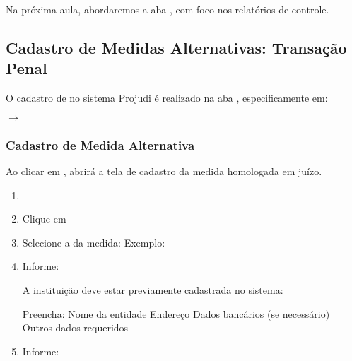 \documentclass[letterpaper,10pt,brazil]{sphinxmanual}
\begin{document}
\sphinxAtStartPar
Na próxima aula, abordaremos a aba , com foco nos relatórios de controle.

\sphinxstepscope


\subsection{Cadastro de Medidas Alternativas: Transação Penal}
\label{\detokenize{projud_54_cadastromedidasalternativas:cadastro-de-medidas-alternativas-transacao-penal}}\label{\detokenize{projud_54_cadastromedidasalternativas::doc}}
\sphinxAtStartPar
O cadastro de  no sistema Projudi é realizado na aba
, especificamente em:

\sphinxAtStartPar
{} \(\rightarrow\) 


\subsubsection{Cadastro de Medida Alternativa}
\label{\detokenize{projud_54_cadastromedidasalternativas:cadastro-de-medida-alternativa}}
\sphinxAtStartPar
Ao clicar em , abrirá a tela de cadastro da medida homologada em juízo.
\begin{enumerate}
%
\item {} 
\sphinxAtStartPar
{}

\item {} 
\sphinxAtStartPar
Clique em 

\item {} 
\sphinxAtStartPar
Selecione a  da medida:
\sphinxhyphen{} Exemplo: 

\item {} 
\sphinxAtStartPar
Informe:
\sphinxhyphen{} 
\sphinxhyphen{} 
\sphinxhyphen{} 

\sphinxAtStartPar
A instituição deve estar previamente cadastrada no sistema:

\sphinxAtStartPar
{}

\sphinxAtStartPar
Preencha:
\sphinxhyphen{} Nome da entidade
\sphinxhyphen{} Endereço
\sphinxhyphen{} Dados bancários (se necessário)
\sphinxhyphen{} Outros dados requeridos

\item {} 
\sphinxAtStartPar
Informe:
\sphinxhyphen{} 
\sphinxhyphen{} 
\sphinxhyphen{} 

\end{enumerate}
\end{document}
